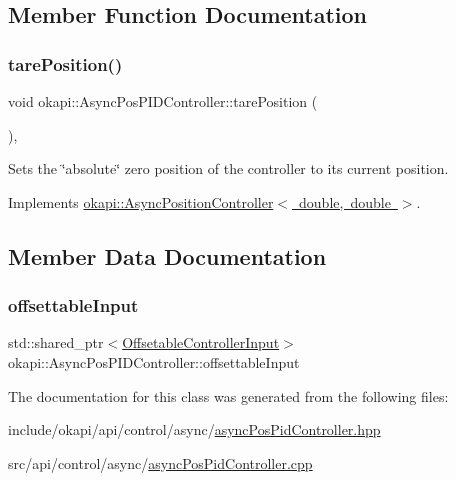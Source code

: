 \subsection{Member Function Documentation}
\mbox{\label{classokapi_1_1AsyncPosPIDController_a4d5bb5646dcdc3bc80f15c1d6ae72747}} 
\subsubsection{\texorpdfstring{tarePosition()}{tarePosition()}}
{\footnotesize\ttfamily void okapi\+::\+Async\+Pos\+P\+I\+D\+Controller\+::tare\+Position (\begin{DoxyParamCaption}{ }\end{DoxyParamCaption})\hspace{0.3cm}{\ttfamily [override]}, {\ttfamily [virtual]}}

Sets the \char`\"{}absolute\char`\"{} zero position of the controller to its current position. 

Implements \mbox{\hyperlink{classokapi_1_1AsyncPositionController_a0af03d0035343cbf843a19374f38a059}{okapi\+::\+Async\+Position\+Controller$<$ double, double $>$}}.



\subsection{Member Data Documentation}
\mbox{\label{classokapi_1_1AsyncPosPIDController_a6e7a064075af197d89f4369e3c8e48b6}} 
\subsubsection{\texorpdfstring{offsettableInput}{offsettableInput}}
{\footnotesize\ttfamily std\+::shared\+\_\+ptr$<$\mbox{\hyperlink{classokapi_1_1OffsetableControllerInput}{Offsetable\+Controller\+Input}}$>$ okapi\+::\+Async\+Pos\+P\+I\+D\+Controller\+::offsettable\+Input\hspace{0.3cm}{\ttfamily [protected]}}



The documentation for this class was generated from the following files\+:\begin{DoxyCompactItemize}
\item 
include/okapi/api/control/async/\mbox{\hyperlink{asyncPosPidController_8hpp}{async\+Pos\+Pid\+Controller.\+hpp}}\item 
src/api/control/async/\mbox{\hyperlink{asyncPosPidController_8cpp}{async\+Pos\+Pid\+Controller.\+cpp}}\end{DoxyCompactItemize}
